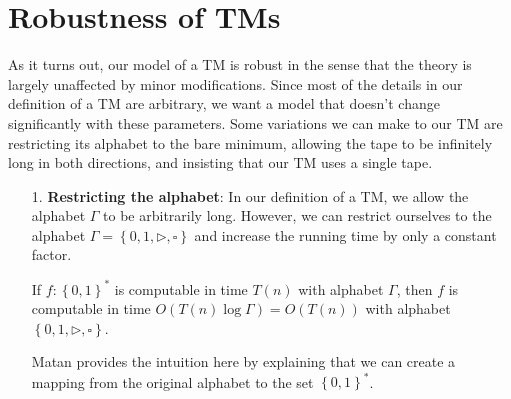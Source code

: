 \documentclass[usletter]{article}
\begin{document}
\section{Robustness of TMs}
As it turns out, our model of a TM is robust in the sense that the theory is largely unaffected by minor modifications. Since most of the details in our definition of a TM are arbitrary,
we want a model that doesn't change significantly with these parameters. Some variations we can make to our TM are restricting its alphabet to the bare minimum, allowing the tape to be infinitely long in both directions,
and insisting that our TM uses a single tape.

\begin{itemize}
\item[1.] \textbf{Restricting the alphabet}: In our definition of a TM, we allow the alphabet
\(\Gamma\) to be arbitrarily long. However, we can restrict ourselves to the alphabet 
\(\Gamma = \left\{ 0,1, \triangleright, \square \right\}\) and increase the running time
by only a constant factor. 

\begin{theorem}
    If \(f: \left\{ 0,1 \right\}^*\) is computable in time \(T(n)\) with alphabet \(\Gamma\), then \(f\) is computable in time \(O(T(n)\log \Gamma) = O(T(n))\) with alphabet \(\left\{ 0,1,\triangleright, \square \right\}\).
\end{theorem}

Matan provides the intuition here by explaining that we can 
create a mapping from the original alphabet to the set \(\left\{ 0,1 \right\}^*\). 
\begin{figure}[h]
\centering
{}
\end{figure}
\end{itemize}
\end{document}

